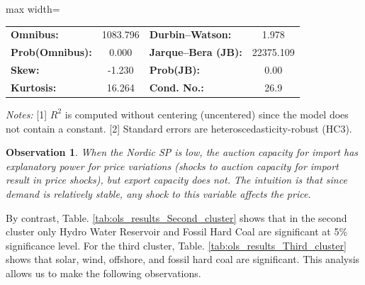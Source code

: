 \documentclass{article}
\newtheorem{observation}{Observation}
\begin{document}
\begin{table}[t]
\vspace{0.6em}

\begin{adjustbox}{max width=\columnwidth}
\begin{tabular}{lclc}
\textbf{Omnibus:} & 1083.796 & \textbf{Durbin--Watson:} & 1.978 \\
\textbf{Prob(Omnibus):} & 0.000 & \textbf{Jarque--Bera (JB):} & 22375.109 \\
\textbf{Skew:} & -1.230 & \textbf{Prob(JB):} & 0.00 \\
\textbf{Kurtosis:} & 16.264 & \textbf{Cond. No.:} & 26.9 \\
\bottomrule
\end{tabular}
\end{adjustbox}

\footnotesize
\medskip

\emph{Notes:} [1] $R^2$ is computed without centering (uncentered) since the model does not contain a constant. [2] Standard errors are heteroscedasticity-robust (HC3).
\label{tab:ols_results_cluster_First}
\end{table}



\begin{observation} \label{observation1}
    When the Nordic SP is low, the auction capacity for import has explanatory power for price variations (shocks to auction capacity for import result in price shocks), but export capacity does not. The intuition is that since demand is relatively stable, any shock to this variable affects the price.
\end{observation}


By contrast, Table. \ref{tab:ols_results_Second_cluster} shows that in the second cluster only Hydro Water Reservoir and Fossil Hard Coal are significant at 5\% significance level. For the third cluster, Table. \ref{tab:ols_results_Third_cluster} shows that solar, wind, offshore, and fossil hard coal are significant. This analysis allows us to make the following observations.
\end{document}
